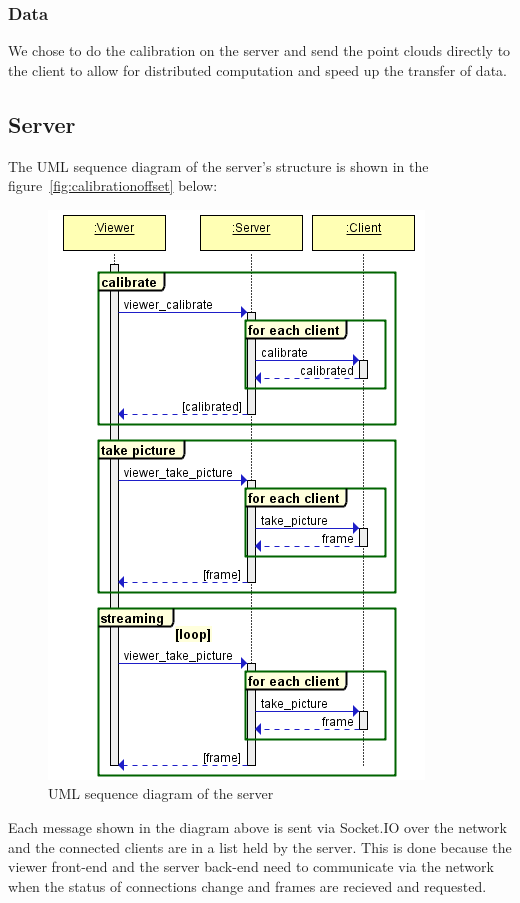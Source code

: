 \documentclass{article}
\begin{document}
\subsubsection{Data}
We chose to do the calibration on the server and send the point clouds directly to the client to allow for distributed computation and speed up the transfer of data. 
\newpage
\subsection{Server}
The UML sequence diagram of the server's structure is shown in the figure~\ref{fig:calibrationoffset} below:
\begin{figure}[h]
  \centering
  \includegraphics[scale=0.6]{serverUML}
  \caption{UML sequence diagram of the server}
\end{figure}

Each message shown in the diagram above is sent via Socket.IO over the network and the connected clients are in a list held by the server. This is done because the viewer front-end and the server back-end need to communicate via the network when the status of connections change and frames are recieved and requested. 
\end{document}
